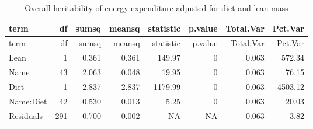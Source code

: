 \documentclass[]{article}
\newenvironment{Shaded}{\begin{snugshade}}{\end{snugshade}}
\newcommand{\DataTypeTok}[1]{\textcolor[rgb]{0.13,0.29,0.53}{#1}}
\newcommand{\DecValTok}[1]{\textcolor[rgb]{0.00,0.00,0.81}{#1}}
\newcommand{\KeywordTok}[1]{\textcolor[rgb]{0.13,0.29,0.53}{\textbf{#1}}}
\newcommand{\NormalTok}[1]{#1}
\newcommand{\OperatorTok}[1]{\textcolor[rgb]{0.81,0.36,0.00}{\textbf{#1}}}
\newcommand{\StringTok}[1]{\textcolor[rgb]{0.31,0.60,0.02}{#1}}
\begin{document}
\begin{Shaded}
\end{Shaded}

\begin{longtable}[]{@{}lrrrrrrr@{}}
\caption{Overall heritability of energy expenditure adjusted for diet
and lean mass}\tabularnewline
\toprule
term & df & sumsq & meansq & statistic & p.value & Total.Var &
Pct.Var\tabularnewline
\midrule
\endfirsthead
\toprule
term & df & sumsq & meansq & statistic & p.value & Total.Var &
Pct.Var\tabularnewline
\midrule
\endhead
Lean & 1 & 0.361 & 0.361 & 149.97 & 0 & 0.063 & 572.34\tabularnewline
Name & 43 & 2.063 & 0.048 & 19.95 & 0 & 0.063 & 76.15\tabularnewline
Diet & 1 & 2.837 & 2.837 & 1179.99 & 0 & 0.063 & 4503.12\tabularnewline
Name:Diet & 42 & 0.530 & 0.013 & 5.25 & 0 & 0.063 & 20.03\tabularnewline
Residuals & 291 & 0.700 & 0.002 & NA & NA & 0.063 & 3.82\tabularnewline
\bottomrule
\end{longtable}
\end{document}
